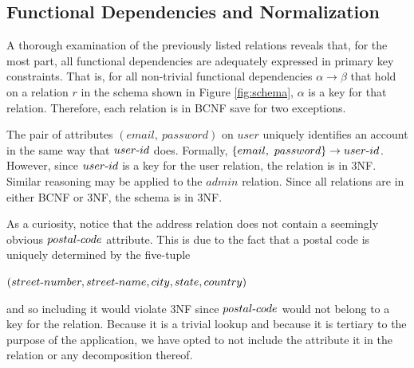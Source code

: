 \documentclass{article}
\newcommand{\tdash}{\textnormal{-}}
\begin{document}
        \subsection{Functional Dependencies and Normalization}
            A thorough examination of the previously listed relations reveals that, for the most part, all functional
            dependencies are adequately expressed in primary key constraints. That is, for all non-trivial functional
            dependencies $\alpha \rightarrow \beta$ that hold on a relation $r$ in the schema shown in Figure
            \ref{fig:schema}, $\alpha$ is a key for that relation. Therefore, each relation is in BCNF save for two
            exceptions. \par The pair of attributes $(email, \ password)$ on $user$ uniquely identifies an account in
            the same way that $user \tdash id$ does. Formally, $\{email, \ password\} \rightarrow user \tdash id$.
            However, since $user \tdash id$ is a key for the user relation, the relation is in 3NF. Similar reasoning
            may be applied to the $admin$ relation. Since all relations are in either BCNF or 3NF, the schema is in 3NF.
            \par As a curiosity, notice that the address relation does not contain a seemingly obvious $postal \tdash
            code$ attribute. This is due to the fact that a postal code is uniquely determined by the five-tuple
            \begin{center}
                $(street \tdash number, street \tdash name, city, state, country)$
            \end{center}
            and so including it would violate 3NF since $postal \tdash code$ would not belong to a key for the relation.
            Because it is a trivial lookup and because it is tertiary to the purpose of the application, we have opted
            to not include the attribute it in the relation or any decomposition thereof.
\end{document}
